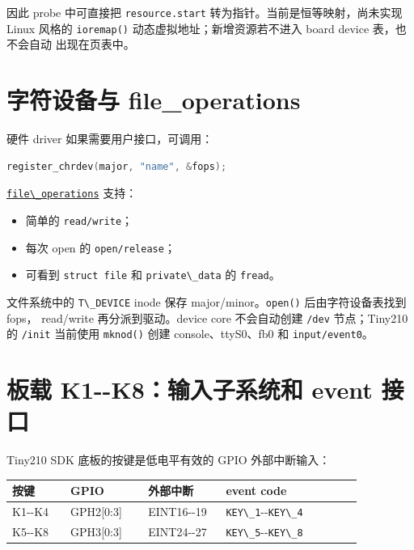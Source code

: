 因此 probe 中可直接把 \passthrough{\lstinline!resource.start!}
转为指针。当前是恒等映射，尚未实现 Linux 风格的
\passthrough{\lstinline!ioremap()!} 动态虚拟地址；新增资源若不进入 board
device 表，也不会自动 出现在页表中。

\section{字符设备与
file\_operations}\label{ux5b57ux7b26ux8bbeux5907ux4e0e-file_operations}

硬件 driver 如果需要用户接口，可调用：

\begin{lstlisting}[language=C]
register_chrdev(major, "name", &fops);
\end{lstlisting}

\href{../../../kernel/device.h}{\passthrough{\lstinline!file\_operations!}}
支持：

\begin{itemize}
\tightlist
\item
  简单的 \passthrough{\lstinline!read/write!}；
\item
  每次 open 的 \passthrough{\lstinline!open/release!}；
\item
  可看到 \passthrough{\lstinline!struct file!} 和
  \passthrough{\lstinline!private\_data!} 的
  \passthrough{\lstinline!fread!}。
\end{itemize}

文件系统中的 \passthrough{\lstinline!T\_DEVICE!} inode 保存
major/minor。\passthrough{\lstinline!open()!} 后由字符设备表找到 fops，
read/write 再分派到驱动。device core 不会自动创建
\passthrough{\lstinline!/dev!} 节点；Tiny210 的
\passthrough{\lstinline!/init!} 当前使用
\passthrough{\lstinline!mknod()!} 创建 console、ttyS0、fb0 和
\passthrough{\lstinline!input/event0!}。

\section{板载 K1-\/-K8：输入子系统和 event
接口}\label{ux677fux8f7d-k1--k8ux8f93ux5165ux5b50ux7cfbux7edfux548c-event-ux63a5ux53e3}

Tiny210 SDK 底板的按键是低电平有效的 GPIO 外部中断输入：

{\def\LTcaptype{none} %
\begin{longtable}[]{@{}p{0.15\linewidth}p{0.20\linewidth}p{0.20\linewidth}p{0.35\linewidth}@{}}
\toprule\noalign{}
按键 & GPIO & 外部中断 & event code \\
\midrule\noalign{}
\endhead
\bottomrule\noalign{}
\endlastfoot
K1-\/-K4 & GPH2{[}0:3{]} & EINT16-\/-19 &
\passthrough{\lstinline!KEY\_1!}-\/-\passthrough{\lstinline!KEY\_4!} \\
K5-\/-K8 & GPH3{[}0:3{]} & EINT24-\/-27 &
\passthrough{\lstinline!KEY\_5!}-\/-\passthrough{\lstinline!KEY\_8!} \\
\end{longtable}
}

